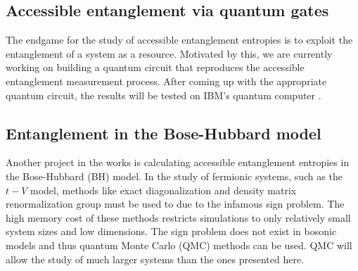 	\subsection{Accessible entanglement via quantum gates}
	
	The endgame for the study of accessible entanglement entropies is to exploit the entanglement of a system as a resource. Motivated by this, we are currently working on building a quantum circuit that reproduces the accessible entanglement measurement process. After coming up with the appropriate quantum circuit, the results will be tested on IBM's quantum computer \cite{IBMQuantumExp:2018:Online}.
	
	\subsection{Entanglement in the Bose-Hubbard model}
	
	Another project in the works is calculating accessible entanglement entropies in the Bose-Hubbard (BH) model. In the study of fermionic systems, such as the $t-V$ model, methods like exact diagonalization and density matrix renormalization group must be used to due to the infamous sign problem. The high memory cost of these methods restricts simulations to only relatively small system sizes and low dimensions. The sign problem does not exist in bosonic models and thus quantum Monte Carlo (QMC) methods can be used. QMC will allow the study of much larger systems than the ones presented here.